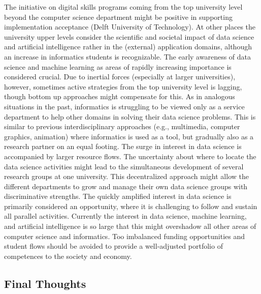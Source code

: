 The initiative on digital skills programs coming from the top university level beyond the computer science department might be positive in supporting implementation acceptance (Delft University of Technology). At other places the university upper levels consider the scientific and societal impact of data science and artificial intelligence rather in the (external) application domains, although an increase in informatics students is recognizable. The early awareness of data science and machine learning as areas of rapidly increasing importance is considered crucial. Due to inertial forces (especially at larger universities), however, sometimes active strategies from the top university level is lagging, though bottom up approaches might compensate for this. As in analogous situations in the past, informatics is struggling to be viewed only as a service department to help other domains in solving their data science problems. This is similar to previous interdisciplinary approaches (e.g., multimedia, computer graphics, animation) where informatics is used as a tool, but gradually also as a research partner on an equal footing. The surge in interest in data science is accompanied by larger resource flows. The uncertainty about where to locate the data science activities might lead to the simultaneous development of several research groups at one university. This decentralized approach might allow the different departments to grow and manage their own data science groups with discriminative strengths. The quickly amplified interest in data science is primarily considered an opportunity, where it is challenging to follow and sustain all parallel activities. Currently the interest in data science, machine learning, and artificial intelligence is so large that this might overshadow all other areas of computer science and informatics. Too imbalanced funding opportunities and student flows should be avoided to provide a well-adjusted portfolio of competences to the society and economy.

\subsection{Final Thoughts}

